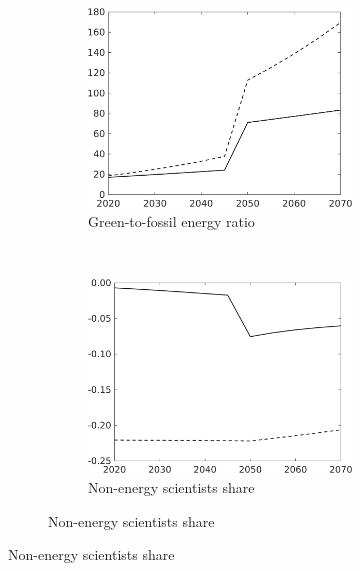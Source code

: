 \begin{figure}[h!!!]
\begin{subfigure}[]{1\textwidth}
\vspace{3mm}
\begin{subfigure}[]{0.4\textwidth}
				\caption{Green-to-fossil energy ratio}
	\includegraphics[width=1\textwidth]{../../codding_model/own_basedOnFried/optimalPol_010922_revision/figures/all_13Sept22_Tplus30/GFF_PercentageLFDyn_Target_regime4_knspil0_spillover0_noskill0_sep0_xgrowth0_PV1_etaa0.79_lgd0.png}
\end{subfigure}
\begin{minipage}[]{0.1\textwidth}
	\ 
\end{minipage}
\begin{subfigure}[]{0.4\textwidth}
			\caption{ Non-energy scientists share}
	\includegraphics[width=1\textwidth]{../../codding_model/own_basedOnFried/optimalPol_010922_revision/figures/all_13Sept22_Tplus30/snS_PercentageLFDyn_Target_regime4_knspil0_spillover0_noskill0_sep0_xgrowth0_PV1_etaa0.79_lgd0.png}
\end{subfigure}
\end{subfigure}


\end{figure}
